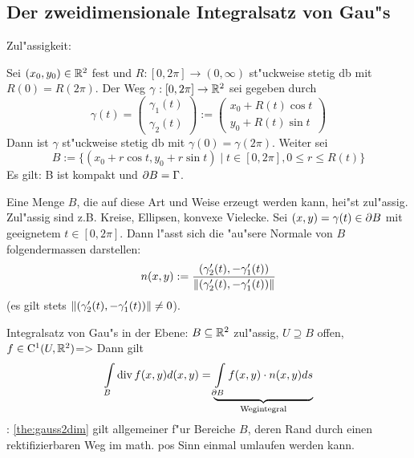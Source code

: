 \subsection{Der zweidimensionale Integralsatz von Gau"s}
 Zul"assigkeit:{
  Sei $(x_0,y_0)\in\mathbb R^2$ fest und $R:[0,2\pi]\to(0,\infty)$ st"uckweise
  stetig db mit $R(0)=R(2\pi)$. Der Weg $\gamma:[0,2\pi]\to\mathbb R^2$ sei
  gegeben durch
  \[\gamma(t)=\begin{pmatrix}
      \gamma_1(t)\\
      \gamma_2(t)
    \end{pmatrix}:=\begin{pmatrix}
      x_0+R(t)\cos t \\
      y_0+R(t)\sin t 
      \end{pmatrix}
    \]
  Dann ist $\gamma$ st"uckweise stetig db mit $\gamma(0)=\gamma(2\pi)$.
  Weiter sei
  \[B:=\{(x_0+r\cos t,y_0+r\sin t)\mid t\in[0,2\pi],0\leq r\leq R(t)\}
    \]
  Es gilt: B ist kompakt und $\partial{B}=\Gamma$.
  
  Eine Menge $B$, die auf diese Art und Weise erzeugt werden kann, hei"st
  zul"assig. Zul"assig sind z.B. Kreise, Ellipsen, konvexe Vielecke.
  Sei $(x,y)=\gamma(t)\in\partial{B}$ mit geeignetem $t\in[0,2\pi]$. Dann l"asst
  sich die "au"sere Normale von $B$ folgendermassen darstellen:
  \[n(x,y):=\frac {(\gamma_2'(t),-\gamma_1'(t))} 
            {{\left\| (\gamma_2'(t),-\gamma_1'(t))\right\|}}
    \] 
  (es gilt stets ${\left\| (\gamma_2'(t),-\gamma_1'(t))\right\|}\neq 0$).
  }
\theorem Integralsatz von Gau"s in der Ebene:
  $B\subseteq\mathbb R^2$ zul"assig, $U\supseteq B$ offen, 
  $f\in{\rm C}^1(U,\mathbb R^2)$=>{
  \label{the:gauss2dim}
  Dann gilt
  \[\int_B \div f(x,y) d(x,y)=
      \underbrace{ \int_{\rim B} f(x,y)\cdot n(x,y) ds }
      _{\text{Wegintegral}}
    \]
  }
\remark:{
  \ref{the:gauss2dim} gilt allgemeiner f"ur Bereiche $B$, deren Rand 
  durch einen rektifizierbaren Weg im math. pos Sinn einmal umlaufen werden
  kann.
  }
